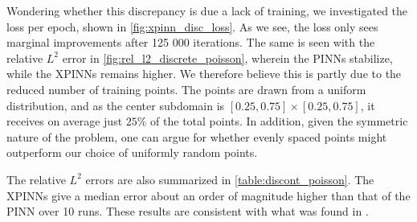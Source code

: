 Wondering whether this discrepancy is due a lack of training, we investigated the loss per epoch, shown in \autoref{fig:xpinn_disc_loss}.
As we see, the loss only sees marginal improvements after 125 000 iterations.
The same is seen with the relative $L^2$ error in \autoref{fig:rel_l2_discrete_poisson}, wherein the PINNs stabilize, while the XPINNs remains higher.
We therefore believe this is partly due to the reduced number of training points.
The points are drawn from a uniform distribution, and as the center subdomain is $[0.25, 0.75] \times [0.25, 0.75]$, it receives on average just $25\%$ of the total points.
In addition, given the symmetric nature of the problem, one can argue for whether evenly spaced points might outperform our choice of uniformly random points.

The relative $L^2$ errors are also summarized in \autoref{table:discont_poisson}.
The XPINNs give a median error about an order of magnitude higher than that of the PINN over 10 runs.
These results are consistent with what was found in \cite{XPINN_generalize}.

